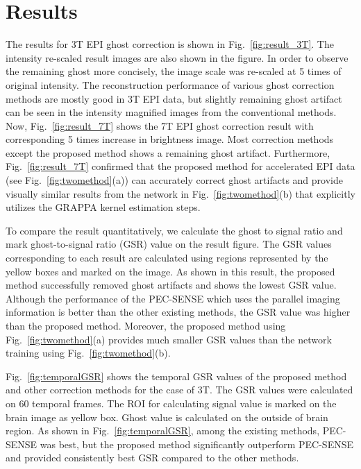 \documentclass[num-refs]{wiley-article}
\newcommand{\0}{{\boldsymbol{0}}}
\newcommand{\1}{\blmath{1}}
\begin{document}
	
	
	\section{Results}
	
	The results for 3T EPI ghost correction is shown in Fig.~\ref{fig:result_3T}. The intensity re-scaled result images are also shown in the figure. In order to observe the remaining ghost more concisely, the image scale was re-scaled at 5 times of original intensity. The  reconstruction performance of various ghost correction methods are mostly good in 3T EPI data, but  slightly remaining ghost artifact can be seen in the intensity magnified images from the conventional methods.  %
	Now, Fig.~\ref{fig:result_7T} shows the 7T EPI ghost correction result with corresponding 5 times increase in brightness image. Most correction methods except the proposed method shows a remaining ghost artifact. 
	Furthermore, Fig.~\ref{fig:result_7T} confirmed that
	the proposed method for accelerated EPI data (see Fig.~\ref{fig:twomethod}(a))
	can accurately correct ghost artifacts and provide visually similar results from the network in Fig.~\ref{fig:twomethod}(b) that explicitly utilizes the
	GRAPPA kernel estimation steps.
	
	
	To compare the result quantitatively, we calculate the ghost to signal ratio and mark ghost-to-signal ratio (GSR) value on the result figure. The GSR values corresponding to each result are calculated using regions represented by the yellow boxes and marked on the image. As shown in this result, the proposed method successfully removed ghost artifacts and shows the lowest GSR value. Although the performance of the PEC-SENSE which uses the parallel imaging information is better than the other existing methods, the GSR value was higher than the proposed method.  Moreover,
	the proposed method using Fig.~\ref{fig:twomethod}(a) provides much smaller GSR values than the network training using
	Fig.~\ref{fig:twomethod}(b).
	
	
	Fig.~\ref{fig:temporalGSR} shows the temporal GSR values of the proposed method and other correction methods for the case of 3T. 
	The GSR values were calculated on 60 temporal frames. The ROI for calculating signal value is marked on the brain image as yellow box. Ghost value is calculated on the outside of brain region. As shown in Fig.~\ref{fig:temporalGSR}, among the existing methods,
	PEC-SENSE was best, but the proposed method significantly outperform PEC-SENSE and provided
	consistently best GSR compared to the other methods. 
	
\end{document}
